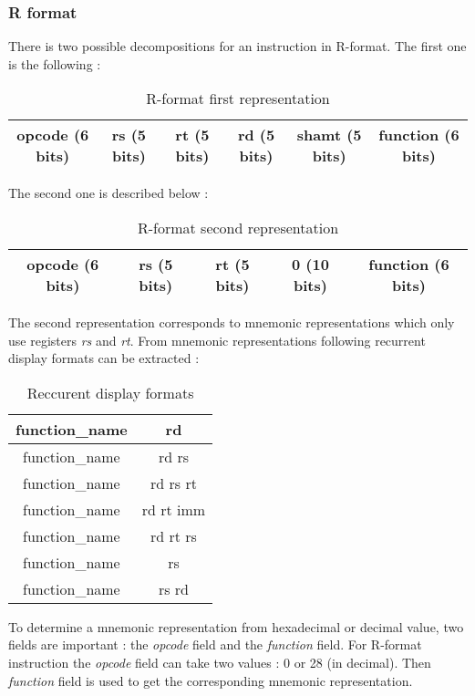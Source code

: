 \subsubsection*{R format}

	There is two possible decompositions for an instruction in R-format. The first one is the following : 
	
	\begin{table}[H]
	\centering
		\begin{tabular}{|c|c|c|c|c|c|}
			\hline 
	opcode (6 bits) & rs (5 bits) & rt (5 bits) & rd (5 bits) & shamt (5 bits) & function (6 bits) \\ 
			\hline 
		\end{tabular} 
		\caption{R-format first representation}
	\end{table}
	
	The second one is described below :
	\begin{table}[H]
		\centering
		\begin{tabular}{|c|c|c|c|c|}
			\hline 
	opcode (6 bits) & rs (5 bits) & rt (5 bits) & 0 (10 bits) & function (6 bits) \\ 
			\hline 
		\end{tabular} 
		\caption{R-format second representation}
	\end{table}
	
	The second representation corresponds to mnemonic representations which only use registers \textit{rs} and \textit{rt}. From mnemonic representations following recurrent display formats can be extracted :
	
	\begin{table}[H]
	\centering
	\begin{tabular}{|c|c|}
	\hline 
	function\_name & rd \\ 
	\hline 
	function\_name & rd rs \\ 
	\hline 
	function\_name & rd rs rt \\ 
	\hline 
	function\_name & rd rt imm \\ 
	\hline 
	function\_name & rd rt rs \\ 
	\hline 
	function\_name & rs \\ 
	\hline 
	function\_name & rs rd \\ 
	\hline 
	\end{tabular}
	\caption{Reccurent display formats}
	\end{table}
	
	To determine a mnemonic representation from hexadecimal or decimal value, two fields are important : the \textit{opcode} field and the \textit{function} field. For R-format instruction the \textit{opcode} field can take two values : 0 or 28 (in decimal). Then \textit{function} field is used to get the corresponding mnemonic representation.